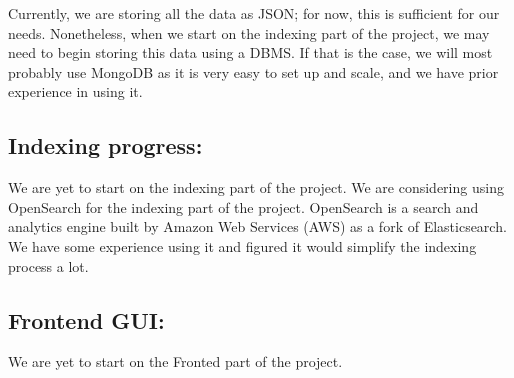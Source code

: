 \documentclass[unicode,11pt,a4paper,oneside,numbers=endperiod,openany]{scrartcl}
\begin{document}
Currently, we are storing all the data as JSON; for now, this is sufficient for our needs. Nonetheless, when we start on the indexing part of the project, we may need to begin storing this data using a DBMS. If that is the case, we will most probably use MongoDB as it is very easy to set up and scale, and we have prior experience in using it.


\subsection*{Indexing progress:}

We are yet to start on the indexing part of the project. We are considering using OpenSearch for the indexing part of the project. OpenSearch is a search and analytics engine built by Amazon Web Services (AWS) as a fork of Elasticsearch. We have some experience using it and figured it would simplify the indexing process a lot.



\subsection*{Frontend GUI:}

We are yet to start on the Fronted part of the project.
\end{document}
